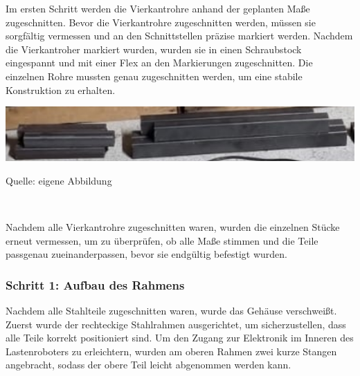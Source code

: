 \documentclass[ngerman,12pt,a4paper]{article}
\begin{document}
		Im ersten Schritt werden die Vierkantrohre anhand der geplanten Maße zugeschnitten. Bevor die Vierkantrohre zugeschnitten werden, müssen sie sorgfältig vermessen und an den Schnittstellen präzise markiert werden. Nachdem die Vierkantroher markiert wurden, wurden sie in einen Schraubstock eingespannt und mit einer Flex an den Markierungen zugeschnitten. Die einzelnen Rohre mussten genau zugeschnitten werden, um eine stabile Konstruktion zu erhalten.
		\begin{center} 
			\begin{minipage}[t]{\textwidth}
				\includegraphics{Pictures/Stahlprofil}
				\label{fig:Stahlprofil}
				\vspace{-10pt}
				\begin{center}
					\par\small Quelle: eigene Abbildung 
				\end{center}
			\end{minipage} \\[0.75cm]
		\end{center} 
		Nachdem alle Vierkantrohre zugeschnitten waren, wurden die einzelnen Stücke erneut vermessen, um zu überprüfen, ob alle Maße stimmen und die Teile passgenau zueinanderpassen, bevor sie endgültig befestigt wurden.
		
		\subsubsection*{Schritt 1: Aufbau des Rahmens}
		
		Nachdem alle Stahlteile zugeschnitten waren, wurde das Gehäuse verschweißt. Zuerst wurde der rechteckige Stahlrahmen ausgerichtet, um sicherzustellen, dass alle Teile korrekt positioniert sind. Um den Zugang zur Elektronik im Inneren des Lastenroboters zu erleichtern, wurden am oberen Rahmen zwei kurze Stangen angebracht, sodass der obere Teil leicht abgenommen werden kann.
		
\end{document}
